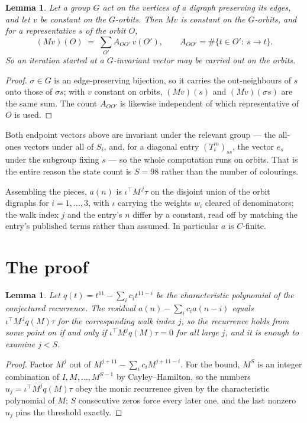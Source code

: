\documentclass[11pt,a4paper]{article}
\theoremstyle{plain}
\newtheorem{lemma}[theorem]{Lemma}
\theoremstyle{definition}
\begin{document}
\begin{lemma}\label{lem:lump}
Let a group $G$ act on the vertices of a digraph preserving its edges, and let $v$ be constant
on the $G$-orbits. Then $Mv$ is constant on the $G$-orbits, and for a representative $s$ of
the orbit $O$,
\[
(Mv)(O)\;=\;\sum_{O'}A_{OO'}\,v(O'),\qquad
A_{OO'}=\#\{t\in O':\ s\to t\} .
\]
So an iteration started at a $G$-invariant vector may be carried out on the orbits.
\end{lemma}

\begin{proof}
$\sigma\in G$ is an edge-preserving bijection, so it carries the out-neighbours of $s$ onto
those of $\sigma s$; with $v$ constant on orbits, $(Mv)(s)$ and $(Mv)(\sigma s)$ are the same
sum. The count $A_{OO'}$ is likewise independent of which representative of $O$ is used.
\end{proof}

Both endpoint vectors above are invariant under the relevant group --- the all-ones vectors
under all of $S_i$, and, for a diagonal entry $(T_i^m)_{ss}$, the vector $e_s$ under the
subgroup fixing $s$ --- so the whole computation runs on orbits. That is the entire reason the
state count is $S=98$ rather than the number of colourings.

Assembling the pieces, $a(n)$ is $\iota^{\!\top}M^{\,j}\tau$ on the disjoint union of the
orbit digraphs for $i=1,\dots,3$, with $\iota$ carrying the weights $w_i$ cleared of
denominators; the walk index $j$ and the entry's $n$ differ by a constant, read off by
matching the entry's published terms rather than assumed. In particular $a$ is $C$-finite.

\section{The proof}

\begin{lemma}\label{lem:crit}
Let $q(t)=t^{11}-\sum_i c_it^{11-i}$ be the characteristic polynomial of the
conjectured recurrence. The residual $a(n)-\sum_ic_ia(n-i)$ equals
$\iota^{\!\top}M^{\,j}q(M)\tau$ for the corresponding walk index $j$, so the recurrence
holds from some point on if and only if $\iota^{\!\top}M^{j}q(M)\tau=0$ for all large $j$,
and it is enough to examine $j<S$.
\end{lemma}

\begin{proof}
Factor $M^{j}$ out of $M^{j+11}-\sum_ic_iM^{j+11-i}$. For the bound, $M^{S}$
is an integer combination of $I,M,\dots,M^{S-1}$ by Cayley--Hamilton, so the numbers
$u_j=\iota^{\!\top}M^{j}q(M)\tau$ obey the monic recurrence given by the characteristic
polynomial of $M$; $S$ consecutive zeros force every later one, and the last nonzero $u_j$
pins the threshold exactly.
\end{proof}
\end{document}
